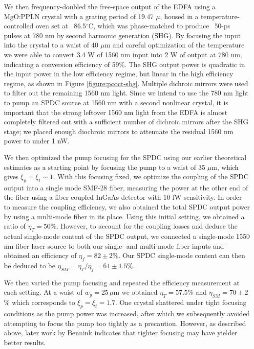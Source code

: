 We then frequency-doubled the free-space output of the EDFA using a MgO:PPLN crystal with a grating period of 19.47 $\mu$, housed in a temperature-controlled oven set at ~86.5$^\circ$C, which was phase-matched to produce ~50-ps pulses at 780 nm by second harmonic generation (SHG). By focusing the input into the crystal to a waist of 40 $\mu$m and careful optimization of the temperature we were able to convert 3.4 W of 1560 nm input into 2 W of output at 780 nm, indicating a conversion efficiency of 59\%. The SHG output power is quadratic in the input power in the low efficiency regime, but linear in the high efficiency regime, as shown in Figure \ref{figure:pcoct-shg}. Multiple dichroic mirrors were used to filter out the remaining 1560 nm light. Since we intend to use the 780 nm light to pump an SPDC source at 1560 nm with a second nonlinear crystal, it is important that the strong leftover 1560 nm light from the EDFA is almost completely filtered out with a sufficient number of dichroic mirrors after the SHG stage; we placed enough diochroic mirrors to attenuate the residual 1560 nm power to under 1 nW.

We then optimized the pump focusing for the SPDC using our earlier theoretical estimates as a starting point by focusing the pump to a waist of 35 $\mu$m, which gives $\xi_p = \xi_t \sim 1$. With this focusing fixed, we optimize the coupling of the SPDC output into a single mode SMF-28 fiber, measuring the power at the other end of the fiber using a fiber-coupled InGaAs detector with 10-fW sensitivity. In order to measure the coupling efficiency, we also obtained the total SPDC output power by using a multi-mode fiber in its place. Using this initial setting, we obtained a ratio of $\eta_T = 50$\%. However, to account for the coupling losses and deduce the actual single-mode content of the SPDC output, we connected a single-mode 1550 nm fiber laser source to both our single- and multi-mode fiber inputs and obtained an efficiency of $\eta_{f} = 82 \pm 2$\%. Our SPDC single-mode content can then be deduced to be $\eta_{SM} = \eta_{T}/\eta_{f} = 61 \pm 1.5$\%.

We then varied the pump focusing and repeated the efficiency measurement at each setting. At a waist of $w_p = 25\,\mu$m we obtained $\eta_T = 57.5$\% and $\eta_{SM} = 70 \pm 2$\% which corresponds to $\xi_p = \xi_t = 1.7$. One crystal shattered under tight focusing conditions as the pump power was increased, after which we subsequently avoided attempting to focus the pump too tightly as a precaution. However, as described above, later work by Bennink \cite{bennink-optimal} indicates that tighter focusing may have yielder better results.

